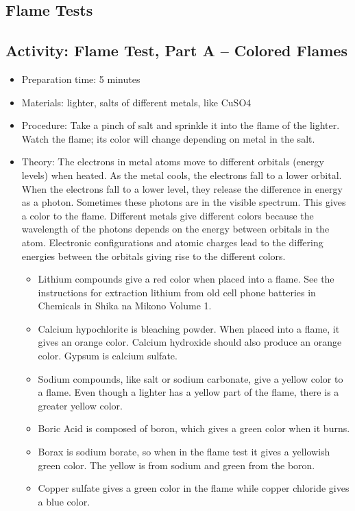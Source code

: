 \begin{itemize}
{\begin{itemize}
\section{Flame Tests}

\subsection{Activity: Flame Test, Part A – Colored Flames}
\begin{itemize}
\item{Preparation time: 5 minutes}
\item{Materials: lighter, salts of different metals, like CuSO4}
\item{Procedure: Take a pinch of salt and sprinkle it into the flame of the lighter. Watch the flame; its color will change depending on metal in the salt.}
\item{Theory: The electrons in metal atoms move to different orbitals (energy levels) when heated. As the metal cools, the electrons fall to a lower orbital. When the electrons fall to a lower level, they release the difference in energy as a photon. Sometimes these photons are in the visible spectrum. This gives a color to the flame. Different metals give different colors because the wavelength of the photons depends on the energy between orbitals in the atom. Electronic configurations and atomic charges lead to the differing energies between the orbitals giving rise to the different colors.
\begin{itemize}
\item{Lithium compounds give a red color when placed into a flame. See the instructions for extraction lithium from old cell phone batteries in Chemicals in Shika na Mikono Volume 1.}
\item{Calcium hypochlorite is bleaching powder. When placed into a flame, it gives an orange color. Calcium hydroxide should also produce an orange color. Gypsum is calcium sulfate.}
\item{Sodium compounds, like salt or sodium carbonate, give a yellow color to a flame. Even though a lighter has a yellow part of the flame, there is a greater yellow color.}
\item{Boric Acid is composed of boron, which gives a green color when it burns.}
\item{Borax is sodium borate, so when in the flame test it gives a yellowish green color. The yellow is from sodium and green from the boron.}
\item{Copper sulfate gives a green color in the flame while copper chloride gives a blue color.}

\end{itemize}}
\end{itemize}
\end{itemize}}
\end{itemize}

